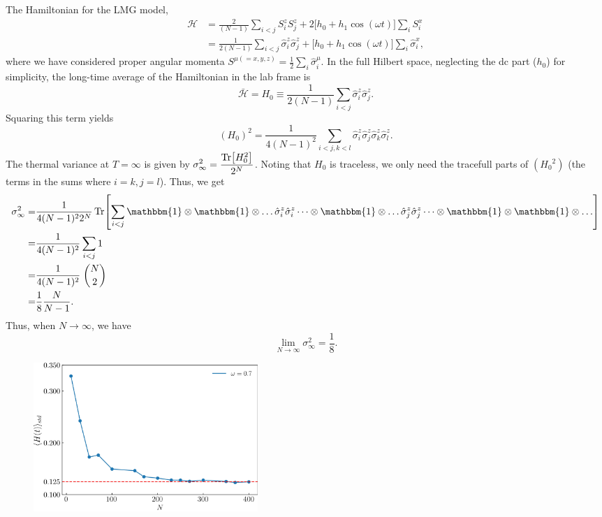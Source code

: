 \documentclass[aps,prb,reprint,showpacs,floatfix,superscriptaddress, onecolumn, nofootinbib, 9pt]{revtex4-2}
\begin{document}
\begin{enumerate}
{			
			The Hamiltonian for the LMG model,
			\begin{align}
				\mathcal{H} &= \frac{2}{(N-1)} \sum_{i<j}S^z_i S^z_j  +2\Big[h_0 +h_1 \cos(\omega t)\Big] \sum_i S^x_i\nonumber\\
				&= \frac{1}{2(N-1)}\sum_{i<j}\hat{\sigma}^z_i \hat{\sigma}^z_j +\Big[h_0 +h_1 \cos(\omega t)\Big] \sum_i \hat{\sigma}^x_i,
			\end{align}
			where we have considered proper angular momenta $\displaystyle S^{\mu(=x,y,z)} = \frac12\sum_i \hat{\sigma}^\mu_i$. In the full Hilbert space, neglecting the dc part ($h_0$) for simplicity, the long-time average of the Hamiltonian in the lab frame is
			\begin{equation*}
			\bar{\mathcal{H}}	= {H}_0 \equiv \frac{1}{2(N-1)}\sum_{i < j}\hat{\sigma}^z_i \hat{\sigma}^z_j.
			\end{equation*}
			Squaring this term yields
			\begin{equation}
				\left({H_0}\right)^2 = \frac{1}{4(N-1)^2}\sum_{i< j, k < l} \hat{\sigma}^z_i \hat{\sigma}^z_j \hat{\sigma}^z_k \hat{\sigma}^z_l .
			\end{equation}
			The thermal variance at $T= \infty$ is given by $\displaystyle \sigma^2_{\infty} = \frac{\Tr[H^2_0]}{2^N}$. 
			Noting that ${H_0}$ is traceless, we only need the tracefull parts of $\left({H_0}^2\right)$ (the terms in the sums where $i=k, j=l$). Thus, we get
			\begin{align*}
				\sigma_\infty^2 =& \frac{1}{4(N-1)^2 2^N}\Tr[\sum_{i< j} \mathbbm{1}\otimes\mathbbm{1}\otimes \dots\hat{\sigma}^z_i \hat{\sigma}^z_i\dots\otimes \mathbbm{1} \otimes \dots \hat{\sigma}^z_j\hat{\sigma}^z_j \dots\otimes \mathbbm{1} \otimes\mathbbm{1}\otimes \dots]\\
				=& \frac{1}{4(N-1)^2}   \sum_{i < j} 1\\
				=& \frac{1}{4(N-1)^2}\;\binom{N}{2}\\
				=& \frac{1}{8} \frac{N}{N-1}.
			\end{align*}
			Thus, when $N\rightarrow \infty$, we have
			\begin{equation}
				\lim\limits_{N\rightarrow\infty}\sigma_\infty^2 = \frac{1}{8}.
				\label{eq:std_inf}
			\end{equation} 
			\begin{figure}[h!]
				\includegraphics[width=8.5cm]{hbar_avg_std_w0p7.jpg}

\end{figure}}
\end{enumerate}
\end{document}
